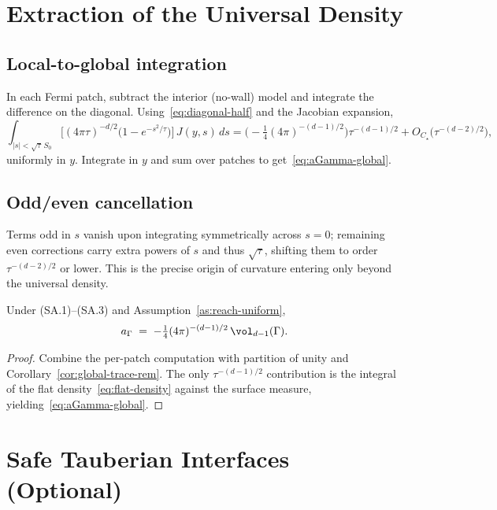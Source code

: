 \section{Extraction of the Universal Density}
\label{sec:extraction}

\subsection{Local-to-global integration}
In each Fermi patch, subtract the interior (no-wall) model and integrate the difference on the diagonal. Using~\eqref{eq:diagonal-half} and the Jacobian expansion,
\[
\int_{|s|<\sqrt{\tau}\,S_0}\!\!\!\! \Big[(4\pi\tau)^{-d/2}\big(1-e^{-s^2/\tau}\big)\Big]\,J(y,s)\,ds
=\Big(-\tfrac14(4\pi)^{-(d-1)/2}\Big)\tau^{-(d-1)/2}
+O_{C_\star}\!\big(\tau^{-(d-2)/2}\big),
\]
uniformly in $y$.
Integrate in $y$ and sum over patches to get~\eqref{eq:aGamma-global}.

\subsection{Odd/even cancellation}
Terms odd in $s$ vanish upon integrating symmetrically across $s=0$; remaining even corrections carry extra powers of $s$ and thus $\sqrt{\tau}$, shifting them to order $\tau^{-(d-2)/2}$ or lower. This is the precise origin of curvature entering only beyond the universal density.

\begin{proposition}\label{prop:coef-ident}
Under (SA.1)--(SA.3) and Assumption~\ref{as:reach-uniform},
\[
a_\Gamma \;=\; -\tfrac14(4\pi)^{-(d-1)/2}\,\vol_{d-1}(\Gamma).
\]
\end{proposition}

\begin{proof}
Combine the per-patch computation with partition of unity and Corollary~\ref{cor:global-trace-rem}. The only $\tau^{-(d-1)/2}$ contribution is the integral of the flat density~\eqref{eq:flat-density} against the surface measure, yielding~\eqref{eq:aGamma-global}.
\end{proof}

\section{Safe Tauberian Interfaces (Optional)}
\label{sec:tauberian-interfaces}

